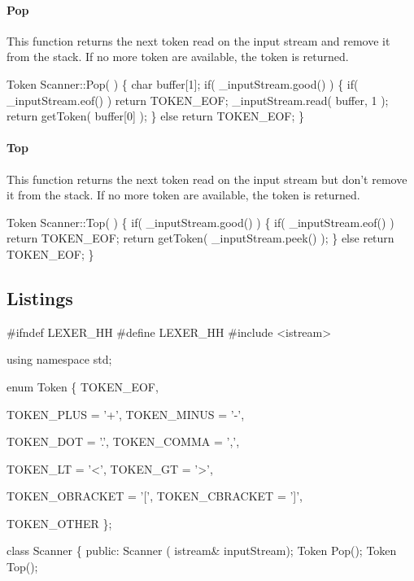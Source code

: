\paragraph{Pop}
This function returns the next token read on the input stream and remove it
from the stack. If no more token are available, the token  is 
returned.

\nwenddocs{}\endmoddef\nwstartdeflinemarkup\nwenddeflinemarkup
Token Scanner::Pop( ) \{
        char buffer[1];
        if( _inputStream.good() ) \{
                if( _inputStream.eof() ) return TOKEN_EOF;
                _inputStream.read( buffer, 1 );
    return getToken( buffer[0] );
        \} else return TOKEN_EOF;
\}
\nwendcode{}\nwdocspar

\paragraph{Top}
This function returns the next token read on the input stream but don't  remove
it from the stack. If no more token are available, the token  
is returned.

\nwenddocs{}\endmoddef\nwstartdeflinemarkup\nwenddeflinemarkup
Token Scanner::Top( ) \{
        if( _inputStream.good() ) \{
                if( _inputStream.eof() ) return TOKEN_EOF;
    return getToken( _inputStream.peek() );
        \} else return TOKEN_EOF;
\}
\nwendcode{}\nwdocspar
\subsection{Listings}
\nwenddocs{}\endmoddef\nwstartdeflinemarkup\nwenddeflinemarkup
#ifndef LEXER_HH
#define LEXER_HH
#include <istream>

using namespace std;

enum Token \{
        TOKEN_EOF,

        TOKEN_PLUS      = '+',
        TOKEN_MINUS     = '-',

        TOKEN_DOT       = '.',
        TOKEN_COMMA     = ',',

        TOKEN_LT        = '<',
        TOKEN_GT        = '>',

        TOKEN_OBRACKET  = '[',
        TOKEN_CBRACKET  = ']',

        TOKEN_OTHER
\};

class Scanner \{
        public:
                Scanner ( istream& inputStream);
                Token Pop();
                Token Top();

